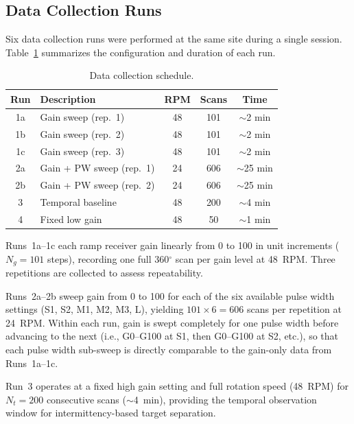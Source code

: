 \documentclass[twocolumn, 10pt]{article}
\begin{document}

\subsection{Data Collection Runs}

Six data collection runs were performed at the same site during a single session. Table~\ref{tab:runs} summarizes the configuration and duration of each run.

\begin{table}[t]
\caption{Data collection schedule.}
\label{tab:runs}
\centering
\begin{tabular}{c l c c c}
\toprule
\textbf{Run} & \textbf{Description} & \textbf{RPM} & \textbf{Scans} & \textbf{Time} \\
\midrule
1a & Gain sweep (rep.\ 1) & 48 & 101 & $\sim$2 min \\
1b & Gain sweep (rep.\ 2) & 48 & 101 & $\sim$2 min \\
1c & Gain sweep (rep.\ 3) & 48 & 101 & $\sim$2 min \\
2a & Gain + PW sweep (rep.\ 1) & 24 & 606 & $\sim$25 min \\
2b & Gain + PW sweep (rep.\ 2) & 24 & 606 & $\sim$25 min \\
3\phantom{a} & Temporal baseline & 48 & 200 & $\sim$4 min \\
4\phantom{a} & Fixed low gain & 48 & 50 & $\sim$1 min \\
\bottomrule
\end{tabular}
\end{table}

Runs~1a--1c each ramp receiver gain linearly from 0 to 100 in unit increments ($N_g = 101$ steps), recording one full 360$^\circ$ scan per gain level at 48~RPM. Three repetitions are collected to assess repeatability.

Runs~2a--2b sweep gain from 0 to 100 for each of the six available pulse width settings (S1, S2, M1, M2, M3, L), yielding $101 \times 6 = 606$ scans per repetition at 24~RPM. Within each run, gain is swept completely for one pulse width before advancing to the next (i.e., G0--G100 at S1, then G0--G100 at S2, etc.), so that each pulse width sub-sweep is directly comparable to the gain-only data from Runs~1a--1c.

Run~3 operates at a fixed high gain setting and full rotation speed (48~RPM) for $N_t = 200$ consecutive scans ($\sim$4~min), providing the temporal observation window for intermittency-based target separation.
\end{document}
